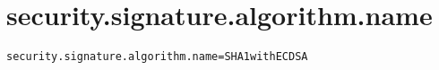 \section{security.signature.algorithm.name}
\label{configuration:SecuritySignatureAlgorithmName}
\ClearAPI
\TODO
{}
\begin{lstlisting}[style=Props,caption={Usage example for \textit{security.signature.algorithm.name}}]
security.signature.algorithm.name=SHA1withECDSA
\end{lstlisting}